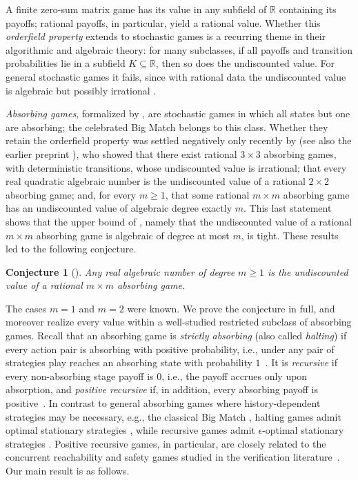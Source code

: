 \documentclass[11pt, a4paper]{article}
\theoremstyle{plain}
\newtheorem{conjecture}{Conjecture}
\theoremstyle{definition}
\newcommand{\R}{\mathbb{R}}
\begin{document}
A finite zero-sum matrix game has its value in any subfield of $\R$ containing its payoffs; rational payoffs, in particular, yield a rational value. Whether this \emph{orderfield property} extends to stochastic games is a recurring theme in their algorithmic and algebraic theory: for many subclasses, if all payoffs and transition probabilities lie in a subfield $K\subseteq\R$, then so does the undiscounted value. For general stochastic games it fails, since with rational data the undiscounted value is algebraic but possibly irrational \citep{BK76}.

\emph{Absorbing games}, formalized by \citet{Koh74}, are stochastic games in which all states but one are absorbing; the celebrated Big Match \citep{Gil57,BF68} belongs to this class. Whether they retain the orderfield property was settled negatively only recently by \citet{OV23} (see also the earlier preprint \citealp{OB23arxiv}), who showed that there exist rational $3\times 3$ absorbing games, with deterministic transitions, whose undiscounted value is irrational; that every real quadratic algebraic number is the undiscounted value of a rational $2\times 2$ absorbing game; and, for every $m\geq 1$, that some rational $m\times m$ absorbing game has an undiscounted value of algebraic degree exactly $m$. This last statement shows that the upper bound of \citet{OB21}, namely that the undiscounted value of a rational $m\times m$ absorbing game is algebraic of degree at most $m$, is tight. These results led \citet{OV23} to the following conjecture.

\begin{conjecture}[{\citealp[Conjecture~1]{OV23}}]\label{conj:OV}
Any real algebraic number of degree $m\geq 1$ is the undiscounted value of a rational $m\times m$ absorbing game.
\end{conjecture}

The cases $m=1$ and $m=2$ \citep[Theorem~3]{OV23} were known.
We prove the conjecture in full, and moreover realize every value within a well-studied restricted subclass of absorbing games. 
Recall that an absorbing game is \emph{strictly absorbing} (also called \emph{halting}) if every action pair is absorbing with positive probability, i.e., under any pair of strategies play reaches an absorbing state with probability $1$~\citep{Sha53}. It is \emph{recursive} if every non-absorbing stage payoff is $0$, i.e., the payoff accrues only upon absorption, and \emph{positive recursive} if, in addition, every absorbing payoff is positive~\citep{Eve57}.
In contrast to general absorbing games where history-dependent strategies may be necessary, e.g., the classical Big Match \citep{Gil57,BF68}, halting games admit optimal stationary strategies \citep{Sha53}, while recursive games admit $\epsilon$-optimal stationary strategies \citep{Eve57}.
Positive recursive games, in particular, are closely related to the concurrent reachability and safety games studied in the verification literature~\citep{AHK98}.
Our main result is as follows.
\end{document}
